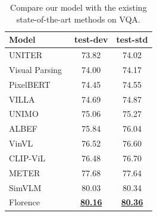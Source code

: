 \documentclass{article}
\begin{document}
\begin{table}[t]
\centering
\setlength{\tabcolsep}{10.5pt}
\small
\renewcommand{\arraystretch}{1.35}
\begin{tabular}{l|cc}
\toprule
    Model                                 & test-dev            & test-std \\ \midrule
    UNITER~\cite{chen:uniter}           & 73.82               & 74.02 \\
    Visual Parsing~\cite{xue2021probing}  & 74.00               & 74.17 \\
    PixelBERT~\cite{huang2020pixel}       & 74.45               & 74.55 \\
    VILLA~\cite{gan:villa}             & 74.69               & 74.87 \\
    UNIMO~\cite{li2020unimo}              & 75.06               & 75.27 \\
    ALBEF~\cite{li2021align}              & 75.84               & 76.04 \\
    VinVL~\cite{Zhang_2021_CVPR}           & 76.52               & 76.60 \\
    CLIP-ViL~\cite{shen2021much}          & 76.48               & 76.70 \\
    METER~\cite{dou2021empirical}         & 77.68               & 77.64 \\
    SimVLM~\cite{wang2021simvlm}          & 80.03               & 80.34 \\
    \midrule
    Florence                            & \underline{\bf{80.16}}      & \underline{\bf{80.36}} \\
    \bottomrule
\end{tabular}
\caption{Compare our model with the existing state-of-the-art methods on VQA.}
  \label{tab:vqa}
\end{table}
\end{document}

